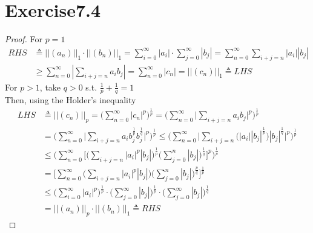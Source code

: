 \documentclass[paper=a4, fontsize=11pt]{scrartcl} %
\numberwithin{equation}{section} %
\numberwithin{figure}{section} %
\numberwithin{table}{section} %
\begin{document}
\section{Exercise7.4}
	\begin{proof}
		For $p = 1$
		\begin{equation}
			\begin{aligned}
				RHS & \triangleq ||(a_n)||_1 \cdot ||(b_n)||_1 = \sum_{i=0}^{\infty} |a_i| \cdot \sum_{j=0}^{\infty} |b_j| = \sum_{n=0}^{\infty} \sum_{i+j=n} |a_i||b_j|\\
				 & \geq \sum_{n=0}^{\infty} |\sum_{i+j=n} a_i b_j| = \sum_{n=0}^{\infty} |c_n| = ||(c_n)||_1 \triangleq LHS
			\end{aligned}
		\end{equation} 
		For $p>1$, take $q > 0$ s.t. $\frac{1}{p} + \frac{1}{q} = 1$\\
		Then, using the Holder's inequality
		\begin{equation}
			\begin{aligned}
				LHS & \triangleq ||(c_n)||_p = \Big(\sum_{n=0}^{\infty} |c_n|^p\Big)^{\frac{1}{p}} = \Big(\sum_{n=0}^{\infty} \Big|\sum_{i+j=n}a_i b_j\Big|^p\Big)^{\frac{1}{p}}\\
				& = \Big(\sum_{n=0}^{\infty} \Big|\sum_{i+j=n}a_i b_j^\frac{1}{p} b_j^{\frac{1}{q}}\Big|^p\Big)^{\frac{1}{p}} \leq  \Big(\sum_{n=0}^{\infty} \Big|\sum_{i+j=n}\Big(|a_i| |b_j|^\frac{1}{p}\Big) |b_j|^{\frac{1}{q}}\Big|^p\Big)^{\frac{1}{p}}\\
				& \leq \Big(\sum_{n=0}^{\infty} \Big[\Big(\sum_{i+j=n}|a_i|^p |b_j|\Big)^\frac{1}{p} \Big(\sum_{j=0}^{n}|b_j|\Big)^\frac{1}{q}\Big]^p\Big)^{\frac{1}{p}} \\ 
				& = \Bigg[\sum_{n=0}^{\infty} \Big(\sum_{i+j=n}|a_i|^p |b_j|\Big) \Big(\sum_{j=0}^{n}|b_j|\Big)^\frac{p}{q}\Bigg]^\frac{1}{p} \\
				& \leq \Big(\sum_{i=0}^{\infty}|a_i|^p\Big)^\frac{1}{p}\cdot\Big(\sum_{j=0}^{\infty}|b_j|\Big)^\frac{1}{p}\cdot\Big(\sum_{j=0}^{\infty}|b_j|\Big)^\frac{1}{q}\\
				& = ||(a_n)||_p \cdot ||(b_n)||_1 \triangleq RHS
			\end{aligned}
		\end{equation}
	\end{proof}
\end{document}
